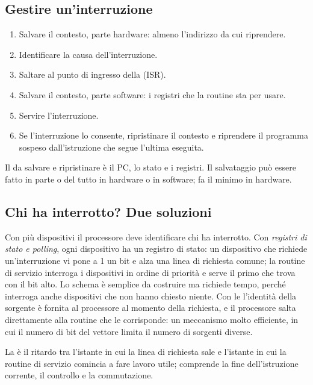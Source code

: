 \subsection{Gestire un'interruzione}

\begin{enumerate}
\item Salvare il contesto, parte hardware: almeno l'indirizzo da cui
  riprendere.
\item Identificare la causa dell'interruzione.
\item Saltare al punto di ingresso della  (ISR).
\item Salvare il contesto, parte software: i registri che la routine sta per
  usare.
\item Servire l'interruzione.
\item Se l'interruzione lo consente, ripristinare il contesto e riprendere il
  programma sospeso dall'istruzione che segue l'ultima eseguita.
\end{enumerate}

Il  da salvare e ripristinare è il PC, lo stato e i registri.
Il salvataggio può essere fatto in parte o del tutto in hardware o in
software; \riscv fa il minimo in hardware.

\subsection{Chi ha interrotto? Due soluzioni}

Con più dispositivi il processore deve identificare chi ha interrotto. Con
\emph{registri di stato e polling}, ogni dispositivo ha un registro di stato:
un dispositivo che richiede un'interruzione vi pone a 1 un bit e alza una
linea di richiesta comune; la routine di servizio interroga i dispositivi in
ordine di priorità e serve il primo che trova con il bit alto. Lo schema è
semplice da costruire ma richiede tempo, perché interroga anche dispositivi
che non hanno chiesto niente. Con le 
l'identità della sorgente è fornita al processore al momento della richiesta,
e il processore salta direttamente alla routine che le corrisponde: un
meccanismo molto efficiente, in cui il numero di bit del vettore limita il
numero di sorgenti diverse.

La  è il ritardo tra l'istante in cui la linea
di richiesta sale e l'istante in cui la routine di servizio comincia a fare
lavoro utile; comprende la fine dell'istruzione corrente, il controllo e la
commutazione.

